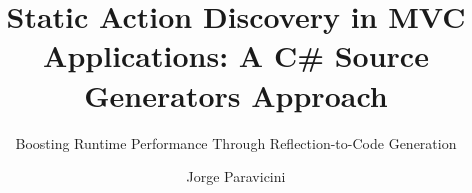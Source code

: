 \title{Static Action Discovery in MVC Applications: A C\# Source Generators Approach}
\subtitle{Boosting Runtime Performance Through Reflection-to-Code Generation} %
\author{Jorge Paravicini}
